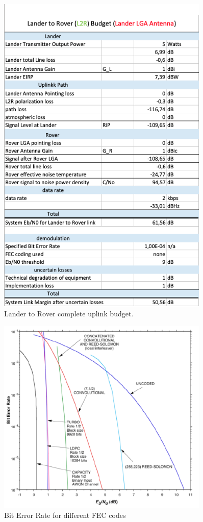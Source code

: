 \begin{figure}[h]
	\centering
  		\includegraphics[width=0.9\textwidth]{Media/LB-LandertoRover.png}
  \caption{Lander to Rover complete uplink budget.}
  \label{fig:LB-L2R}
\end{figure}

\begin{figure}[h]
	\centering
  		\includegraphics[width=0.9\textwidth]{Media/Bit_Error_Rate.png}
  \caption{Bit Error Rate for different FEC codes}
  \label{fig:BitErrorRate}
\end{figure}

